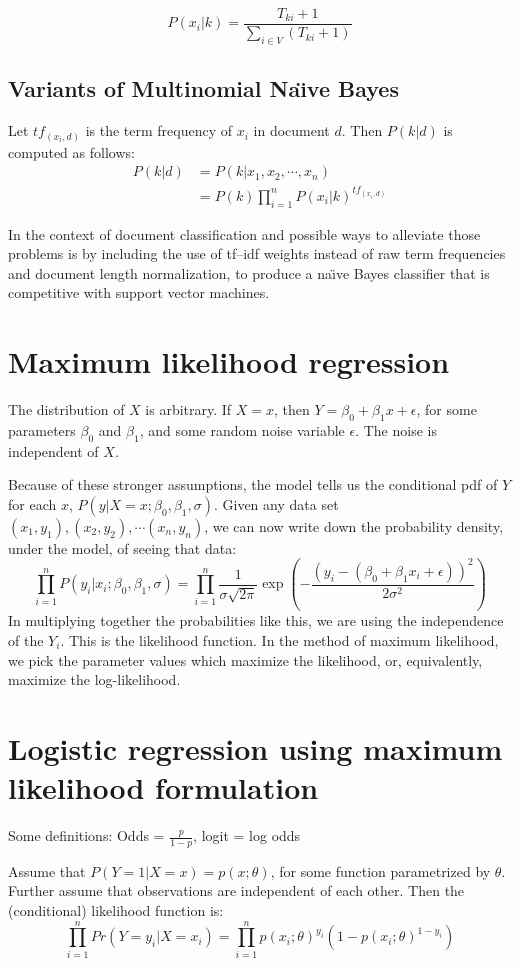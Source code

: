 \documentclass{article}
\begin{document}
\[P(x_i|k) = \frac{T_{ki}+1}{\sum_{i \in V} (T_{ki}+1)}\]



\subsection{Variants of Multinomial Na\"{\i}ve Bayes}
Let $tf_{(x_i,d)}$ is the term frequency of $x_i$ in document $d$. Then $P(k|d)$ is computed as follows:
\begin{align*} 
P(k|d) &= P(k|x_1,x_2,\cdots,x_n) \\
 &= P(k)\prod_{i=1}^{n} P(x_i|k)^{tf_{(x_i,d)}}
\end{align*}


In the context of document classification and possible ways to alleviate those problems is by including the use of tf–idf weights instead of raw term frequencies and document length normalization, to produce a na\"{\i}ve Bayes classifier that is competitive with support vector machines.

\section{Maximum likelihood regression}
The distribution of $X$ is arbitrary. If $X=x$, then $Y=\beta_0+\beta_1 x+\epsilon$, for some parameters $\beta_0$ and $\beta_1$, and some random noise variable $\epsilon$. The noise is independent of $X$.

Because of these stronger assumptions, the model tells us the conditional pdf of $Y$ for each $x$, $P(y|X=x;\beta_0,\beta_1,\sigma)$. Given any data set $(x_1,y_1),(x_2,y_2),\cdots (x_n,y_n)$, we can now write down the probability density, under the model, of seeing that data:
\[
\prod_{i=1}^n P(y_i|x_i;\beta_0,\beta_1,\sigma) = \prod_{i=1}^n \frac{1}{\sigma\sqrt{2\pi}}  \exp \left( -\frac{(y_i-(\beta_0+\beta_1 x_i+\epsilon))^2}{2\sigma^2} \right)
\]
In multiplying together the probabilities like this, we are using the independence of the $Y_i$. This is the likelihood function. In the method of maximum likelihood, we pick the parameter values which  maximize  the  likelihood,  or,  equivalently,  maximize  the  log-likelihood.

\section{Logistic regression using maximum likelihood formulation}
Some definitions:
Odds = $\frac{p}{1-p}$, logit = log odds

Assume that $P(Y=1|X=x)=p(x;\theta)$, for some function parametrized by $\theta$. Further assume that observations are independent of each other. Then the (conditional) likelihood function is:
\[
\prod_{i=1}^{n} Pr(Y=y_i|X=x_i) = \prod_{i=1}^{n} p(x_i;\theta)^{y_i} (1-p(x_i;\theta)^{1-y_i}) 
\]
\end{document}
